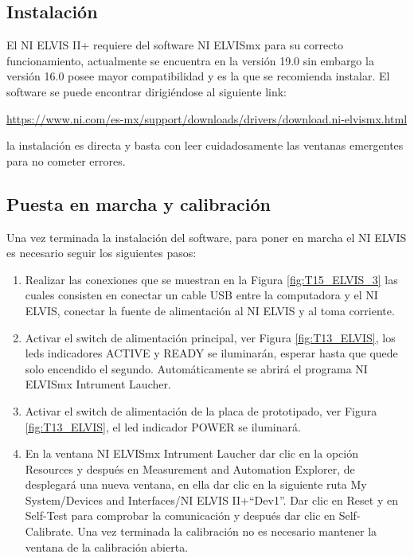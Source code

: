 		\subsection{Instalación}

	El NI ELVIS II+ requiere del software NI ELVISmx para su correcto funcionamiento, actualmente se encuentra en la versión 19.0 sin embargo la versión 16.0 posee mayor compatibilidad y es la que se recomienda instalar. El software se puede encontrar dirigiéndose al siguiente link:  

	\begin{center}
		\url{https://www.ni.com/es-mx/support/downloads/drivers/download.ni-elvismx.html}
	\end{center}
	la instalación es directa y basta con leer cuidadosamente las ventanas emergentes para no cometer errores.
		
		\subsection{Puesta en marcha y calibración}

	Una vez terminada la instalación del software, para poner en marcha el NI ELVIS es necesario seguir los siguientes pasos:
	\begin{enumerate}
		\item Realizar las conexiones que se muestran en la Figura \ref{fig:T15_ELVIS_3} las cuales consisten en conectar un cable USB entre la computadora y el NI ELVIS, conectar la fuente de alimentación al NI ELVIS y al toma corriente.
		\item Activar el switch de alimentación principal, ver Figura \ref{fig:T13_ELVIS}, los leds indicadores ACTIVE y READY se iluminarán, esperar hasta que quede solo encendido el segundo. Automáticamente se abrirá el programa NI ELVISmx Intrument Laucher.
		\item Activar el switch de alimentación de la placa de prototipado, ver Figura \ref{fig:T13_ELVIS}, el led indicador POWER se iluminará.
		\item En la ventana NI ELVISmx Intrument Laucher dar clic en la opción Resources y después en Measurement and Automation Explorer, de desplegará una nueva ventana, en ella dar clic en la siguiente ruta My System/Devices and Interfaces/NI ELVIS II+``Dev1''. Dar clic en Reset y en Self-Test para comprobar la comunicación y después dar clic en Self-Calibrate. Una vez terminada la calibración no es necesario mantener la ventana de la calibración abierta.
	\end{enumerate}		
	
